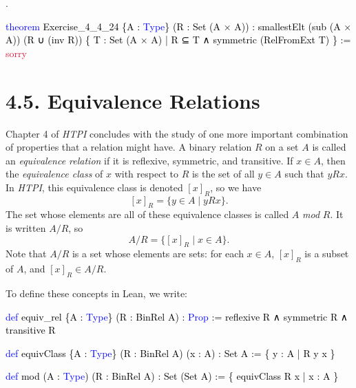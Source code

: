 \documentclass[
  letterpaper,
  DIV=11,
  numbers=noendperiod]{scrreprt}
\newenvironment{Shaded}{\begin{snugshade}}{\end{snugshade}}
\newcommand{\ConstantTok}[1]{\textcolor[rgb]{0.56,0.35,0.01}{#1}}
\newcommand{\KeywordTok}[1]{\textcolor[rgb]{0.00,0.23,0.31}{#1}}
\newcommand{\NormalTok}[1]{\textcolor[rgb]{0.00,0.23,0.31}{#1}}
\renewcommand{\NormalTok}[1]{\textcolor[HTML]{000000}{#1}}
\renewcommand{\KeywordTok}[1]{\textcolor[HTML]{0000FF}{#1}}
\renewcommand{\ConstantTok}[1]{\textcolor[HTML]{DC143C}{#1}}
\newcommand{\nobreakShaded}{\renewenvironment{Shaded}
	{\begin{tcolorbox}[frame hidden, enhanced, interior hidden, boxrule=0pt,
		borderline west={3pt}{0pt}{shadecolor}, sharp corners]}
	{\end{tcolorbox}}}
\newenvironment{numex}[1]
	{\begin{minipage}[t]{0.04\textwidth}\vspace{8pt}{#1}.
		\end{minipage}\nobreakShaded\begin{minipage}[t]{0.96\textwidth}\vspace{0pt}}
	{\end{minipage}}
\theoremstyle{remark}
\begin{document}
\begin{numex}{10}

\begin{Shaded}
\begin{Highlighting}[]
\KeywordTok{theorem}\NormalTok{ Exercise\_4\_4\_24 \{A : }\KeywordTok{Type}\NormalTok{\} (R : Set (A × A)) :}
\NormalTok{    smallestElt (sub (A × A)) (R ∪ (inv R))}
\NormalTok{    \{ T : Set (A × A) | R ⊆ T ∧ symmetric (RelFromExt T) \} := }\ConstantTok{sorry}
\end{Highlighting}
\end{Shaded}

\end{numex}

\hypertarget{equivalence-relations}{%
\section{4.5. Equivalence Relations}\label{equivalence-relations}}

Chapter 4 of \emph{HTPI} concludes with the study of one more important
combination of properties that a relation might have. A binary relation
\(R\) on a set \(A\) is called an \emph{equivalence relation} if it is
reflexive, symmetric, and transitive. If \(x \in A\), then the
\emph{equivalence class} of \(x\) with respect to \(R\) is the set of
all \(y \in A\) such that \(yRx\). In \emph{HTPI}, this equivalence
class is denoted \([x]_R\), so we have \[
[x]_R = \{y \in A \mid yRx\}.
\] The set whose elements are all of these equivalence classes is called
\(A\) \emph{mod} \(R\). It is written \(A/R\), so \[
A/R = \{[x]_R \mid x \in A\}.
\] Note that \(A/R\) is a set whose elements are sets: for each
\(x \in A\), \([x]_R\) is a subset of \(A\), and \([x]_R \in A/R\).

To define these concepts in Lean, we write:

\begin{Shaded}
\begin{Highlighting}[]
\KeywordTok{def}\NormalTok{ equiv\_rel \{A : }\KeywordTok{Type}\NormalTok{\} (R : BinRel A) : }\KeywordTok{Prop}\NormalTok{ :=}
\NormalTok{  reflexive R ∧ symmetric R ∧ transitive R}

\KeywordTok{def}\NormalTok{ equivClass \{A : }\KeywordTok{Type}\NormalTok{\} (R : BinRel A) (x : A) : Set A :=}
\NormalTok{  \{ y : A | R y x \}}

\KeywordTok{def}\NormalTok{ mod (A : }\KeywordTok{Type}\NormalTok{) (R : BinRel A) : Set (Set A) :=}
\NormalTok{  \{ equivClass R x | x : A \}}
\end{Highlighting}
\end{Shaded}
\end{document}
